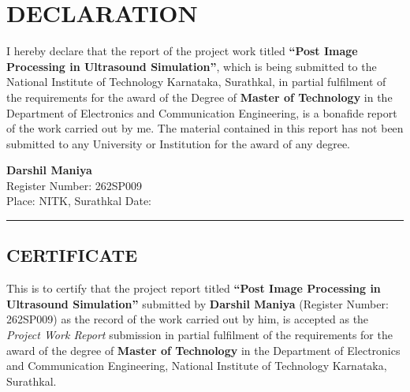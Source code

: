 \documentclass[12pt,a4paper,oneside]{report}
\begin{document}
\setcounter{page}{2}

\chapter*{DECLARATION}
\thispagestyle{plain}

I hereby declare that the report of the project work titled \textbf{``Post Image
Processing in Ultrasound Simulation''}, which is being submitted to the National
Institute of Technology Karnataka, Surathkal, in partial fulfilment of the
requirements for the award of the Degree of \textbf{Master of Technology} in the
Department of Electronics and Communication Engineering, is a bonafide report of
the work carried out by me. The material contained in this report has not been
submitted to any University or Institution for the award of any degree.

\vspace{0.8cm}
\begin{flushleft}
\textbf{Darshil Maniya}\\
Register Number: 262SP009\\[0.5cm]
Place: NITK, Surathkal \hspace{1.5cm} Date: \rule{3cm}{0.4pt}
\end{flushleft}

\vspace{1.0cm}
\section*{\centering CERTIFICATE}

This is to certify that the project report titled \textbf{``Post Image Processing
in Ultrasound Simulation''} submitted by \textbf{Darshil Maniya} (Register Number:
262SP009) as the record of the work carried out by him, is accepted as the
\emph{Project Work Report} submission in partial fulfilment of the requirements
for the award of the degree of \textbf{Master of Technology} in the Department of
Electronics and Communication Engineering, National Institute of Technology
Karnataka, Surathkal.
\end{document}
